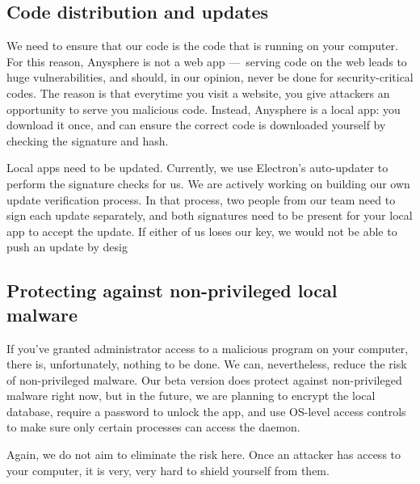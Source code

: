 \subsection{Code distribution and updates}

We need to ensure that our code is the code that is running on your computer. For this reason, Anysphere is not a web app — serving code on the web leads to huge vulnerabilities, and should, in our opinion, never be done for security-critical codes. The reason is that everytime you visit a website, you give attackers an opportunity to serve you malicious code. Instead, Anysphere is a local app: you download it once, and can ensure the correct code is downloaded yourself by checking the signature and hash.


Local apps need to be updated. Currently, we use Electron's auto-updater to perform the signature checks for us. We are actively working on building our own update verification process. In that process, two people from our team need to sign each update separately, and both signatures need to be present for your local app to accept the update. If either of us loses our key, we would not be able to push an update by desig

\subsection{Protecting against non-privileged local malware}

If you've granted administrator access to a malicious program on your computer, there is, unfortunately, nothing to be done. We can, nevertheless, reduce the risk of non-privileged malware. Our beta version does protect against non-privileged malware right now, but in the future, we are planning to encrypt the local database, require a password to unlock the app, and use OS-level access controls to make sure only certain processes can access the daemon.

Again, we do not aim to eliminate the risk here. Once an attacker has access to your computer, it is very, very hard to shield yourself from them.